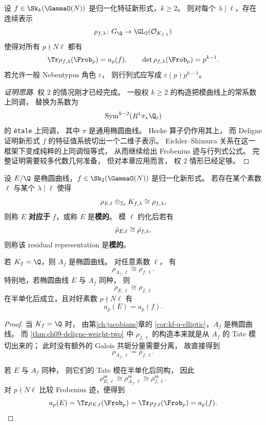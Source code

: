 \begin{theorem}
\label{thm:ch09-deligne-general}
设 $f\in \Sk_k(\GammaO(N))$ 是归一化特征新形式，$k\ge 2$。
则对每个 $\lambda\mid \ell$，存在连续表示
\[
  \rho_{f,\lambda}\colon G_\Q\to \GL_2(\mathcal O_{K_{f,\lambda}})
\]
使得对所有 $p\nmid N\ell$ 都有
\[
  \Tr\rho_{f,\lambda}(\Frob_p)=a_p(f),
  \qquad
  \det\rho_{f,\lambda}(\Frob_p)=p^{k-1}.
\]
若允许一般 Nebentypus 角色 $\varepsilon$，
则行列式应写成 $\varepsilon(p)p^{k-1}$。
\end{theorem}

\begin{proof}[证明思路]
权 $2$ 的情况刚才已经完成。
一般权 $k\ge 2$ 的构造把模曲线上的常系数上同调，
替换为系数为
\[
  \operatorname{Sym}^{k-2}(R^1\pi_*\Q_\ell)
\]
的 \texttt{\'etale} 上同调，
其中 $\pi$ 是通用椭圆曲线。
Hecke 算子仍作用其上，
而 Deligne 证明新形式 $f$ 的特征值系统切出一个二维子表示。
Eichler--Shimura 关系在这一框架下变成纯粹的上同调恒等式，
从而继续给出 Frobenius 迹与行列式公式。
完整证明需要较多代数几何准备，
但对本章应用而言，
权 $2$ 情形已经足够。
\end{proof}

\begin{definition}[模形式性]
设 $E/\Q$ 是椭圆曲线，$f\in \Sk_2(\GammaO(N))$ 是归一化新形式。
若存在某个素数 $\ell$ 与某个 $\lambda\mid \ell$ 使得
\[
  \rho_{E,\ell}\otimes_{\mathbb{Z}_\ell}K_{f,\lambda}
  \cong
  \rho_{f,\lambda},
\]
则称 $E$ \textbf{对应于} $f$，或称 $E$ 是\textbf{模的}。
模 $\ell$ 约化后若有
\[
  \bar{\rho}_{E,\ell}\cong \bar{\rho}_{f,\lambda},
\]
则称该 residual representation 是\textbf{模的}。
\end{definition}

\begin{proposition}[模椭圆曲线的表示与模形式表示一致]
\label{prop:ch09-elliptic-modular-rep-agree}
若 $K_f=\Q$，则 $A_f$ 是椭圆曲线。
对任意素数 $\ell$，
有
\[
  \rho_{A_f,\ell}\cong \rho_{f,\ell}.
\]
特别地，若椭圆曲线 $E$ 与 $A_f$ 同种，
则
\[
  \rho_{E,\ell}\cong \rho_{f,\ell}
\]
在半单化后成立，且对好素数 $p\nmid N\ell$ 有
\[
  a_p(E)=a_p(f).
\]
\end{proposition}

\begin{proof}
当 $K_f=\Q$ 时，
由第\ref{ch:jacobians}章的 \cref{cor:kf-q-elliptic}，$A_f$ 是椭圆曲线。
而 \cref{thm:ch09-deligne-weight-two} 中 $\rho_{f,\ell}$ 的构造本来就是从 $A_f$ 的 Tate 模切出来的；
此时没有额外的 Galois 共轭分量需要分离，
故直接得到
\[
  \rho_{A_f,\ell}=\rho_{f,\ell}.
\]

若 $E$ 与 $A_f$ 同种，
则它们的 Tate 模在半单化后同构，
因此
\[
  \rho_{E,\ell}^{\mathrm{ss}}\cong \rho_{A_f,\ell}^{\mathrm{ss}}\cong \rho_{f,\ell}^{\mathrm{ss}}.
\]
对 $p\nmid N\ell$ 比较 Frobenius 迹，便得到
\[
  a_p(E)=\Tr\rho_{E,\ell}(\Frob_p)=\Tr\rho_{f,\ell}(\Frob_p)=a_p(f).
\]
\end{proof}

